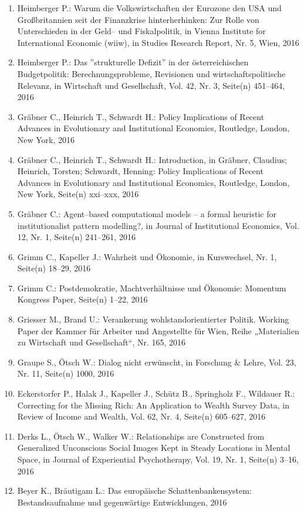\begin{enumerate}
	 \item Heimberger P.: Warum die Volkswirtschaften der Eurozone den USA und Großbritannien seit der Finanzkrise hinterherhinken: Zur Rolle von Unterschieden in der Geld– und Fiskalpolitik, in Vienna Institute for International Economic (wiiw), in Studies Research Report, Nr. 5, Wien, 2016
	 \item Heimberger P.: Das ''strukturelle Defizit'' in der österreichischen Budgetpolitik: Berechnungsprobleme, Revisionen und wirtschaftspolitische Relevanz, in Wirtschaft und Gesellschaft, Vol. 42, Nr. 3, Seite(n) 451--464, 2016
	 \item Gräbner C., Heinrich T., Schwardt H.: Policy Implications of Recent Advances in Evolutionary and Institutional Economics, Routledge, London, New York, 2016
	 \item Gräbner C., Heinrich T., Schwardt H.: Introduction, in Gräbner, Claudius; Heinrich, Torsten; Schwardt, Henning: Policy Implications of Recent Advances in Evolutionary and Institutional Economics, Routledge, London, New York, Seite(n) xxi--xxx, 2016
	 \item Gräbner C.: Agent--based computational models -- a formal heuristic for institutionalist pattern modelling?, in Journal of Institutional Economics, Vol. 12, Nr. 1, Seite(n) 241--261, 2016
	 \item Grimm C., Kapeller J.: Wahrheit und Ökonomie, in Kurswechsel, Nr. 1, Seite(n) 18--29, 2016
	 \item Grimm C.: Postdemokratie, Machtverhältnisse und Ökonomie: Momentum Kongress Paper, Seite(n) 1--22, 2016
	 \item Griesser M., Brand U.: Verankerung wohlstandorientierter Politik. Working Paper der Kammer für Arbeiter und Angestellte für Wien, Reihe „Materialien zu Wirtschaft und Gesellschaft“, Nr. 165, 2016
	 \item Graupe S., Ötsch W.: Dialog nicht erwünscht, in Forschung \& Lehre, Vol. 23, Nr. 11, Seite(n) 1000, 2016
	 \item Eckerstorfer P., Halak J., Kapeller J., Schütz B., Springholz F., Wildauer R.: Correcting for the Missing Rich: An Application to Wealth Survey Data, in Review of Income and Wealth, Vol. 62, Nr. 4, Seite(n) 605--627, 2016
	 \item Derks L., Ötsch W., Walker W.: Relationships are Constructed from Generalized Unconscious Social Images Kept in Steady Locations in Mental Space, in Journal of Experiential Psychotherapy, Vol. 19, Nr. 1, Seite(n) 3--16, 2016
	 \item Beyer K., Bräutigam L.: Das europäische Schattenbankensystem: Bestandsaufnahme und gegenwärtige Entwicklungen, 2016

\end{enumerate}
